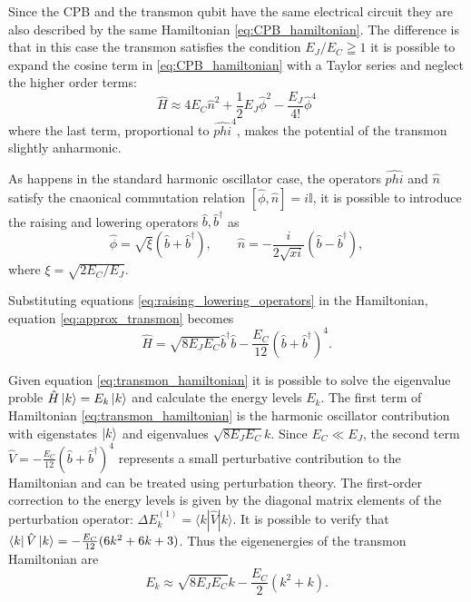 Since the CPB and the transmon qubit have the same electrical circuit they are also described by the same Hamiltonian \ref{eq:CPB_hamiltonian}. 
The difference is that in this case the transmon satisfies the condition $E_J/E_C \geqq 1$ it is possible to expand the cosine term in \ref{eq:CPB_hamiltonian} with a Taylor series and neglect the higher order terms:
\begin{equation}\label{eq:approx_transmon}
    \hat{H}\approx 4E_C\hat{n}^2 + \frac{1}{2}E_J\hat{\phi}^2 - \frac{E_J}{4!}\hat{\phi}^4
\end{equation}
where the last term, proportional to $\hat{phi}^4$, makes the potential of the transmon slightly anharmonic.

As happens in the standard harmonic oscillator case, the operators $\hat{phi}$ and $\hat{n}$ satisfy the cnaonical commutation relation $[\hat{\phi},\hat{n}]=i\mathbb{I}$, it is possible to introduce the raising and lowering operators $\hat{b},\hat{b}^\dagger$ as
\begin{equation}\label{eq:raising_lowering_operators}
    \hat{\phi} = \sqrt{\xi}(\hat{b}+\hat{b}^\dagger), \quad\quad \hat{n} = -\frac{i}{2\sqrt{xi}}(\hat{b}-\hat{b}^\dagger),
\end{equation}
where $\xi =  \sqrt{2E_C/E_J}$.

Substituting equations \ref{eq:raising_lowering_operators} in the Hamiltonian, equation \ref{eq:approx_transmon} becomes
\begin{equation}\label{eq:transmon_hamiltonian}
    \hat{H} = \sqrt{8E_JE_C}\hat{b}^\dagger\hat{b} - \frac{E_C}{12}(\hat{b}+\hat{b}^\dagger)^4.
\end{equation}

Given equation \ref{eq:transmon_hamiltonian} it is possible to solve the eigenvalue proble $\hat{H}\ket{k}=E_k\ket{k}$ and calculate the energy levels $E_k$.
The first term of Hamiltonian \ref{eq:transmon_hamiltonian} is the harmonic oscillator contribution with eigenstates $\ket{k}$ and eigenvalues $\sqrt{8E_JE_C}k$. 
Since $E_C \ll E_J$, the second term $ \hat{V} = -\frac{E_C}{12}(\hat{b} + \hat{b}^\dagger)^4$ represents a small perturbative contribution to the Hamiltonian and can be treated using perturbation theory. 
The first-order correction to the energy levels is given by the diagonal matrix elements of the perturbation operator: $\Delta E_k^{(1)} = \langle k | \hat{V} | k \rangle$.
It is possible to verify that $\bra{k} \hat{V} \ket{k} = -\frac{E_C}{12} (6k^2 + 6k + 3)$. 
Thus the eigenenergies of the transmon Hamiltonian are 
\begin{equation}
    E_k \approx \sqrt{8E_JE_C}k - \frac{E_C}{2}(k^2 + k).
\end{equation}


